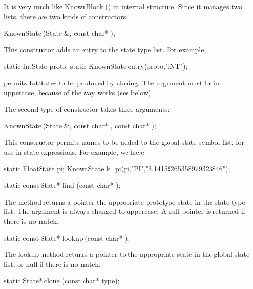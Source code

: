 It is very much like KnownBlock ()
in internal structure.  Since it manages
two lists, there are two kinds of constructors.

\begin{example}
KnownState (State &, const char* );
\end{example}

This constructor adds an entry to the state type list.  For example,

\begin{example}
static IntState proto;
static KnownState entry(proto,"INT");
\end{example}

permits IntStates to be produced by cloning.  The  argument
must be in uppercase, because of the way  works (see below).

The second type of constructor takes three arguments:

\begin{example}
KnownState (State &, const char* , const char* );
\end{example}

This constructor permits names to be added to the global state symbol
list, for use in state expressions.  For example, we have

\begin{example}
static FloatState pi;
KnownState k_pi(pi,"PI","3.14159265358979323846");
\end{example}

\begin{example}
static const State* find (const char* );
\end{example}

The  method returns a pointer the appropriate prototype
state in the state type list.  The argument is always changed to
uppercase.  A null pointer is returned if there is no match.

\begin{example}
static const State* lookup (const char* );
\end{example}

The lookup method returns a pointer to the appropriate state in
the global state list, or null if there is no match.

\begin{example}
static State* clone (const char* type);
\end{example}

